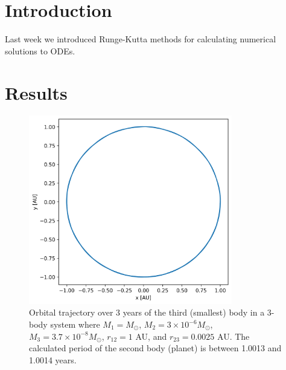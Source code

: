 \documentclass{article}
\author{\hwauthor}
\title{\hwtitle}
\date{\hwdate}
\begin{document}
\maketitle
\thispagestyle{fancy}

\section{Introduction}

Last week we introduced Runge-Kutta methods for calculating numerical solutions to ODEs.

\section{Results}

\bigskip
{}
\medskip

\begin{figure}[!h]
    \centering
    \includegraphics[width=3.5in]{homework4/1-1.png}
    \caption{Orbital trajectory over 3 years of the third (smallest) body in a 3-body system where $M_1=M_\odot$, $M_2=3\times10^{-6}M_\odot$, $M_3 = 3.7\times10^{-8}M_\odot$, $r_{12}=1$ AU, and $r_{23}= 0.0025$ AU. The calculated period of the second body (planet) is between 1.0013 and 1.0014 years.}
    \label{fig:1-1}
\end{figure}
\end{document}
